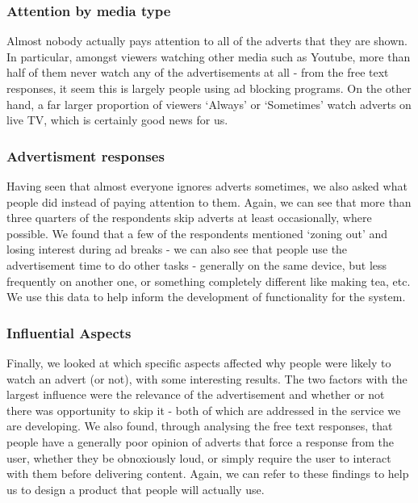 \subsubsection{Attention by media type}
Almost nobody actually pays attention to all of the adverts that they are shown. In particular, amongst viewers watching other media such as Youtube, more than half of them never watch any of the advertisements at all - from the free text responses, it seem this is largely people using ad blocking programs. On the other hand, a far larger proportion of viewers `Always' or `Sometimes' watch adverts on live TV, which is certainly good news for us.

\subsubsection{Advertisment responses}
Having seen that almost everyone ignores adverts sometimes, we also asked what people did instead of paying attention to them. Again, we can see that more than three quarters of the respondents skip adverts at least occasionally, where possible. We found that a few of the respondents mentioned `zoning out' and losing interest during ad breaks - we can also see that people use the advertisement time to do other tasks - generally on the same device, but less frequently on another one, or something completely different like making tea, etc. We use this data to help inform the development of functionality for the system.

\subsubsection{Influential Aspects}
Finally, we looked at which specific aspects affected why people were likely to watch an advert (or not), with some interesting results. The two factors with the largest influence were the relevance of the advertisement and whether or not there was opportunity to skip it - both of which are addressed in the service we are developing. We also found, through analysing the free text responses, that people have a generally poor opinion of adverts that force a response from the user, whether they be obnoxiously loud, or simply require the user to interact with them before delivering content. Again, we can refer to these findings to help us to design a product that people will actually use. 
